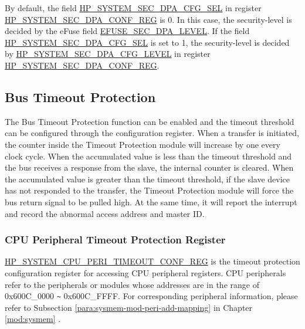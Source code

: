 \documentclass[main\_\_EN.tex]{subfiles}
\begin{document}
By default, the field \hyperref[fielddesc:HPSYSTEMSECDPALEVEL]{HP\_SYSTEM\_SEC\_DPA\_CFG\_SEL} in register \hyperref[regdesc:HPSYSTEMSECDPACONFREG]{HP\_SYSTEM\_SEC\_DPA\_CONF\_REG} is 0. In this case, the security-level is decided by the eFuse field \hyperref[fielddesc:EFUSESECDPALEVEL]{EFUSE\_SEC\_DPA\_LEVEL}. If the field \hyperref[fielddesc:HPSYSTEMSECDPALEVEL]{HP\_SYSTEM\_SEC\_DPA\_CFG\_SEL} is set to 1, the security-level is decided by \hyperref[fielddesc:HPSYSTEMSECDPALEVEL]{HP\_SYSTEM\_SEC\_DPA\_CFG\_LEVEL} in register \hyperref[regdesc:HPSYSTEMSECDPACONFREG]{HP\_SYSTEM\_SEC\_DPA\_CONF\_REG}.











\subsection{Bus Timeout Protection}

The Bus Timeout Protection function can be enabled and the timeout threshold can be configured through the configuration register. When a transfer is initiated, the counter inside the Timeout Protection module will increase by one every clock cycle. When the accumulated value is less than the timeout threshold and the bus receives a response from the slave, the internal counter is cleared. When the accumulated value is greater than the timeout threshold, if the slave device has not responded to the transfer, the Timeout Protection module will force the bus return signal to be pulled high. At the same time, it will report the interrupt and record the abnormal access address and master ID.


\subsubsection{CPU Peripheral Timeout Protection Register}

\hyperref[regdesc:HPSYSTEMCPUPERITIMEOUTCONFREG]{HP\_SYSTEM\_CPU\_PERI\_TIMEOUT\_CONF\_REG} is the timeout protection configuration register for accessing CPU peripheral registers.
CPU peripherals refer to the peripherals or modules whose addresses are in the range of 0x600C\_0000 \verb+~+ 0x600C\_FFFF. For corresponding peripheral information, please refer to Subsection \ref{para:sysmem-mod-peri-add-mapping} \textit{} in Chapter \ref{mod:sysmem} \textit{}.
\end{document}
